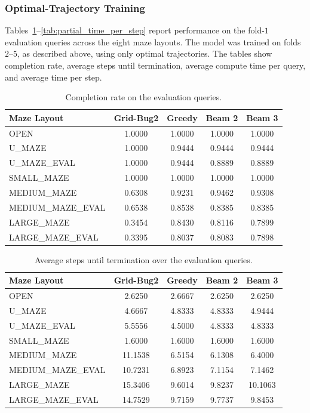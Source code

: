 ﻿\documentclass[12pt,a4paper]{article}
\theoremstyle{definition}
\begin{document}
\subsubsection{Optimal-Trajectory Training}

Tables~\ref{tab:partial_completion_rate}--\ref{tab:partial_time_per_step} report
performance on the fold-$1$ evaluation queries across the eight maze layouts. The model
was trained on folds $2$--$5$, as described above, using only optimal trajectories. 
The tables show completion rate, average steps until termination, average compute time per query,
and average time per step.

\begin{table}[H]
\centering
\caption{Completion rate on the evaluation queries.}
\label{tab:partial_completion_rate}
\footnotesize
\begin{tabular}{lcccc}
\hline
Maze Layout & Grid-Bug2 & Greedy & Beam 2 & Beam 3 \\
\hline
OPEN & 1.0000 & 1.0000 & 1.0000 & 1.0000 \\
U\_MAZE & 1.0000 & 0.9444 & 0.9444 & 0.9444 \\
U\_MAZE\_EVAL & 1.0000 & 0.9444 & 0.8889 & 0.8889 \\
SMALL\_MAZE & 1.0000 & 1.0000 & 1.0000 & 1.0000 \\
MEDIUM\_MAZE & 0.6308 & 0.9231 & 0.9462 & 0.9308 \\
MEDIUM\_MAZE\_EVAL & 0.6538 & 0.8538 & 0.8385 & 0.8385 \\
LARGE\_MAZE & 0.3454 & 0.8430 & 0.8116 & 0.7899 \\
LARGE\_MAZE\_EVAL & 0.3395 & 0.8037 & 0.8083 & 0.7898 \\
\hline
\end{tabular}
\normalsize
\end{table}

\begin{table}[H]
\centering
\caption{Average steps until termination over the evaluation queries.}
\label{tab:partial_avg_steps}
\footnotesize
\begin{tabular}{lcccc}
\hline
Maze Layout & Grid-Bug2 & Greedy & Beam 2 & Beam 3 \\
\hline
OPEN & 2.6250 & 2.6667 & 2.6250 & 2.6250 \\
U\_MAZE & 4.6667 & 4.8333 & 4.8333 & 4.9444 \\
U\_MAZE\_EVAL & 5.5556 & 4.5000 & 4.8333 & 4.8333 \\
SMALL\_MAZE & 1.6000 & 1.6000 & 1.6000 & 1.6000 \\
MEDIUM\_MAZE & 11.1538 & 6.5154 & 6.1308 & 6.4000 \\
MEDIUM\_MAZE\_EVAL & 10.7231 & 6.8923 & 7.1154 & 7.1462 \\
LARGE\_MAZE & 15.3406 & 9.6014 & 9.8237 & 10.1063 \\
LARGE\_MAZE\_EVAL & 14.7529 & 9.7159 & 9.7737 & 9.8453 \\
\hline
\end{tabular}
\normalsize
\end{table}
\end{document}
